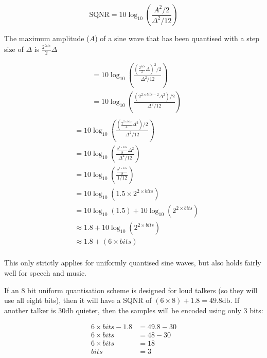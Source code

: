 \begin{mymulticols}
\[
  \text{SQNR} = 10\log_{10}\left(\frac{A^2 / 2}{\Delta^2 / 12}\right)
\]

The maximum amplitude ($A$) of a sine wave that has been quantised with a step
size of $\Delta$ is $\frac{2^{bits}}{2}\Delta$

\allowdisplaybreaks
\begin{align*}
  &= 10\log_{10}\left(\frac{\left(\frac{2^{bits}}{2}\Delta\right)^2 / 2}{\Delta^2 / 12}\right)\\
  &= 10\log_{10}\left(\frac{\left(2^{2 \times bits - 2}\Delta^2\right) / 2}{\Delta^2 / 12}\right)\\
\end{align*}
\begin{align*}
  &= 10\log_{10}\left(\frac{\left(\frac{2^{2 \times bits}}{4}\Delta^2\right) / 2}{\Delta^2 / 12}\right)\\
  &= 10\log_{10}\left(\frac{\frac{2^{2 \times bits}}{8}\Delta^2}{\Delta^2 / 12}\right)\\
  &= 10\log_{10}\left(\frac{\frac{2^{2 \times bits}}{8}}{1 / 12}\right)\\
  &= 10\log_{10}(1.5 \times 2^{2 \times bits})\\
  &= 10\log_{10}(1.5) + 10\log_{10}(2^{2 \times bits})\\
  &\approx 1.8 + 10\log_{10}(2^{2 \times bits})\\
  &\approx 1.8 + (6 \times bits)\\
\end{align*}
\end{mymulticols}

This only strictly applies for uniformly quantised sine waves, but also holds
fairly well for speech and music.

If an 8 bit uniform quantisation scheme is designed for loud talkers (so they
will use all eight bits), then it will have a SQNR of $(6\times 8) + 1.8 =
49.8\si{\decibel}$. If another talker is $30\si{\decibel}$ quieter, then the
samples will be encoded using only $3$ bits:

\begin{align*}
  6 \times bits - 1.8 &= 49.8 - 30\\
  6 \times bits &= 48 - 30\\
  6 \times bits &= 18\\
  bits &= 3
\end{align*}


